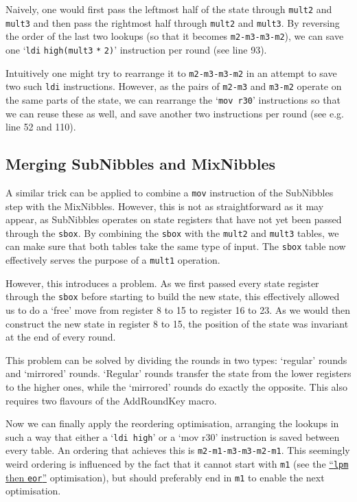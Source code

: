 \documentclass[a4paper]{article}
\begin{document}
Naively, one would first pass the leftmost half of the state through \texttt{mult2} and \texttt{mult3} and then pass the rightmost half through \texttt{mult2} and \texttt{mult3}. By reversing the order of the last two lookups (so that it becomes \texttt{m2-m3-m3-m2}), we can save one `\texttt{ldi} \texttt{high(mult3} \texttt{*} \texttt{2)}' instruction per round (see line 93).

Intuitively one might try to rearrange it to \texttt{m2-m3-m3-m2} in an attempt to save two such \texttt{ldi} instructions. However, as the pairs of \texttt{m2-m3} and \texttt{m3-m2} operate on the same parts of the state, we can rearrange the `\texttt{mov r30}' instructions so that we can reuse these as well, and save another two instructions per round (see e.g. line 52 and 110).

\subsection*{Merging SubNibbles and MixNibbles}

A similar trick can be applied to combine a \texttt{mov} instruction of the SubNibbles step with the MixNibbles. However, this is not as straightforward as it may appear, as SubNibbles operates on state registers that have not yet been passed through the \texttt{sbox}. By combining the \texttt{sbox} with the \texttt{mult2} and \texttt{mult3} tables, we can make sure that both tables take the same type of input. The \texttt{sbox} table now effectively serves the purpose of a \texttt{mult1} operation.

However, this introduces a problem. As we first passed every state register through the \texttt{sbox} before starting to build the new state, this effectively allowed us to do a `free' move from register 8 to 15 to register 16 to 23. As we would then construct the new state in register 8 to 15, the position of the state was invariant at the end of every round.

This problem can be solved by dividing the rounds in two types: `regular' rounds and `mirrored' rounds. `Regular' rounds transfer the state from the lower registers to the higher ones, while the `mirrored' rounds do exactly the opposite. This also requires two flavours of the AddRoundKey macro.

Now we can finally apply the reordering optimisation, arranging the lookups in such a way that either a `\texttt{ldi high}' or a `mov r30' instruction is saved between every table. An ordering that achieves this is 
\texttt{m2-m1-m3-m3-m2-m1}. This seemingly weird ordering is influenced by the fact that it cannot start with \texttt{m1} (see the \hyperlink{lpmtheneor}{``\texttt{lpm} then \texttt{eor}''} optimisation), but should preferably end in \texttt{m1} to enable the next optimisation.
\end{document}

